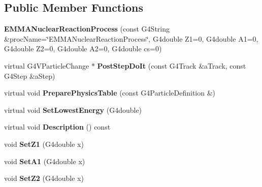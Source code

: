 \subsection*{Public Member Functions}
\begin{DoxyCompactItemize}
\item 
\hypertarget{classEMMANuclearReactionProcess_ad80bfc6b5331a43bb8e635ea1f93e0a7}{{\bfseries E\-M\-M\-A\-Nuclear\-Reaction\-Process} (const G4\-String \&proc\-Name=\char`\"{}E\-M\-M\-A\-Nuclear\-Reaction\-Process\char`\"{}, G4double Z1=0, G4double A1=0, G4double Z2=0, G4double A2=0, G4double cs=0)}\label{classEMMANuclearReactionProcess_ad80bfc6b5331a43bb8e635ea1f93e0a7}

\item 
\hypertarget{classEMMANuclearReactionProcess_ae0f5c5da5e7b5de92ae0ef4ce0cc184f}{virtual G4\-V\-Particle\-Change $\ast$ {\bfseries Post\-Step\-Do\-It} (const G4\-Track \&a\-Track, const G4\-Step \&a\-Step)}\label{classEMMANuclearReactionProcess_ae0f5c5da5e7b5de92ae0ef4ce0cc184f}

\item 
\hypertarget{classEMMANuclearReactionProcess_a23802b4c0b8ee37634133f55cbdd050d}{virtual void {\bfseries Prepare\-Physics\-Table} (const G4\-Particle\-Definition \&)}\label{classEMMANuclearReactionProcess_a23802b4c0b8ee37634133f55cbdd050d}

\item 
\hypertarget{classEMMANuclearReactionProcess_a5c58ee84e79b3a88abd95a1b69ec4adf}{virtual void {\bfseries Set\-Lowest\-Energy} (G4double)}\label{classEMMANuclearReactionProcess_a5c58ee84e79b3a88abd95a1b69ec4adf}

\item 
\hypertarget{classEMMANuclearReactionProcess_a6331442f66f044b7309c567de2a2e652}{virtual void {\bfseries Description} () const }\label{classEMMANuclearReactionProcess_a6331442f66f044b7309c567de2a2e652}

\item 
\hypertarget{classEMMANuclearReactionProcess_ab983a478e9cda304277033b3d7a22995}{void {\bfseries Set\-Z1} (G4double x)}\label{classEMMANuclearReactionProcess_ab983a478e9cda304277033b3d7a22995}

\item 
\hypertarget{classEMMANuclearReactionProcess_ac18e9c45796a362619f28f518e0d5016}{void {\bfseries Set\-A1} (G4double x)}\label{classEMMANuclearReactionProcess_ac18e9c45796a362619f28f518e0d5016}

\item 
\hypertarget{classEMMANuclearReactionProcess_a27bc9f76a9b360a720bb6f50c7fde0b8}{void {\bfseries Set\-Z2} (G4double x)}\label{classEMMANuclearReactionProcess_a27bc9f76a9b360a720bb6f50c7fde0b8}


\end{DoxyCompactItemize}
